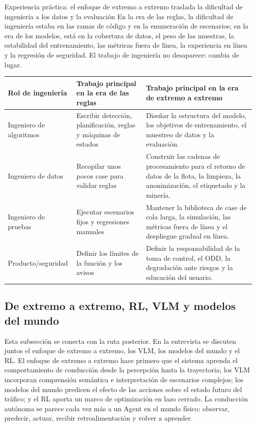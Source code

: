 \begin{knowledgebox}{Experiencia práctica: el enfoque de extremo a extremo traslada la dificultad de ingeniería a los datos y la evaluación}
En la era de las reglas, la dificultad de ingeniería estaba en las ramas de código y en la enumeración de escenarios; en la era de los modelos, está en la cobertura de datos, el peso de las muestras, la estabilidad del entrenamiento, las métricas fuera de línea, la experiencia en línea y la regresión de seguridad. El trabajo de ingeniería no desaparece: cambia de lugar.
\end{knowledgebox}

\noindent\begin{tabularx}{\textwidth}{p{}p{}X}
\toprule
Rol de ingeniería & Trabajo principal en la era de las reglas & Trabajo principal en la era de extremo a extremo \\
\midrule
Ingeniero de algoritmos & Escribir detección, planificación, reglas y máquinas de estados & Diseñar la estructura del modelo, los objetivos de entrenamiento, el muestreo de datos y la evaluación. \\
Ingeniero de datos & Recopilar unos pocos case para validar reglas & Construir las cadenas de procesamiento para el retorno de datos de la flota, la limpieza, la anonimización, el etiquetado y la minería. \\
Ingeniero de pruebas & Ejecutar escenarios fijos y regresiones manuales & Mantener la biblioteca de case de cola larga, la simulación, las métricas fuera de línea y el despliegue gradual en línea. \\
Producto/seguridad & Definir los límites de la función y los avisos & Definir la responsabilidad de la toma de control, el ODD, la degradación ante riesgos y la educación del usuario. \\
\bottomrule
\end{tabularx}

\subsection{De extremo a extremo, RL, VLM y modelos del mundo}

Esta subsección se conecta con la ruta posterior. En la entrevista se discuten juntos el enfoque de extremo a extremo, los VLM, los modelos del mundo y el RL. El enfoque de extremo a extremo hace primero que el sistema aprenda el comportamiento de conducción desde la percepción hasta la trayectoria; los VLM incorporan comprensión semántica e interpretación de escenarios complejos; los modelos del mundo predicen el efecto de las acciones sobre el estado futuro del tráfico; y el RL aporta un marco de optimización en lazo cerrado. La conducción autónoma se parece cada vez más a un Agent en el mundo físico: observar, predecir, actuar, recibir retroalimentación y volver a aprender.

